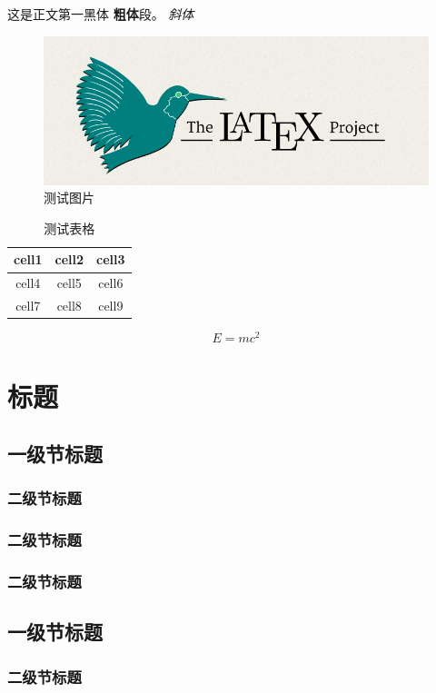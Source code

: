 \documentclass{swjtuthesis}
\begin{document}
这是正文第一{\heiti 黑体 \textbf{粗体}}段\supercite{rosen2000multiprotocol}。
\textit{斜体}

\begin{figure}[hbt]
    \centering
    \includegraphics[width=0.7\linewidth]{example.jpg}
    \caption{测试图片}
\end{figure}

\begin{table}[hbt]
    \centering
    \caption{测试表格}
    \begin{tabular}{ c|c|c } 
    \hline
    cell1 & cell2 & cell3 \\
    \hline
    cell4 & cell5 & cell6 \\ 
    \hline
    cell7 & cell8 & cell9 \\ 
    \hline
    \end{tabular}
\end{table}

\begin{equation}
    E=mc^2
\end{equation}

\chapter{标题}
\section{一级节标题}
\subsection{二级节标题}
\subsection{二级节标题}
\subsection{二级节标题}
\section{一级节标题}
\subsection{二级节标题}
\end{document}
